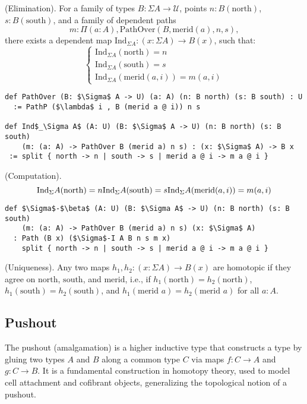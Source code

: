 \documentclass{article}
\begin{document}
\begin{theorem} (Elimination).
For a family of types \( B : \Sigma A \to \mathcal{U} \), points \( n : B(\text{north}) \), \( s : B(\text{south}) \), and a family
of dependent paths
\[
  m : \Pi (a : A), \text{PathOver}(B,\text{merid}(a),n,s),
\]
there exists a dependent map \( \text{Ind}_{\Sigma A} : (x : \Sigma A) \to B(x) \), such that:
\[
\begin{cases}
\text{Ind}_{\Sigma A}(\text{north}) = n \\
\text{Ind}_{\Sigma A}(\text{south}) = s \\
\text{Ind}_{\Sigma A}(\text{merid}(a,i)) = m(a,i)
\end{cases}
\]
\begin{lstlisting}[mathescape=true]
def PathOver (B: $\Sigma$ A -> U) (a: A) (n: B north) (s: B south) : U
  := PathP ($\lambda$ i , B (merid a @ i)) n s

def Ind$_\Sigma A$ (A: U) (B: $\Sigma$ A -> U) (n: B north) (s: B south)
    (m: (a: A) -> PathOver B (merid a) n s) : (x: $\Sigma$ A) -> B x
 := split { north -> n | south -> s | merid a @ i -> m a @ i }
\end{lstlisting}
\end{theorem}

\begin{theorem} (Computation).
\[
    \text{Ind}_\Sigma A(\text{north}) = n \\
    \text{Ind}_\Sigma A(\text{south}) = s \\
    \text{Ind}_\Sigma A(\text{merid}(a,i)) = m(a,i)
\]
\begin{lstlisting}[mathescape=true]
def $\Sigma$-$\beta$ (A: U) (B: $\Sigma A$ -> U) (n: B north) (s: B south)
    (m: (a: A) -> PathOver B (merid a) n s) (x: $\Sigma$ A)
  : Path (B x) ($\Sigma$-I A B n s m x)
    split { north -> n | south -> s | merid a @ i -> m a @ i }
\end{lstlisting}
\end{theorem}

\begin{theorem} (Uniqueness).
Any two maps \( h_1, h_2 : (x : \Sigma A) \to B(x) \) are homotopic if they agree
on \( \text{north} \), \( \text{south} \), and \( \text{merid} \), i.e.,
if \( h_1(\text{north}) = h_2(\text{north}) \), \( h_1(\text{south}) = h_2(\text{south}) \),
and \( h_1(\text{merid } a) = h_2(\text{merid } a) \) for all \( a : A \).
\end{theorem}

\subsection{Pushout}
The pushout (amalgamation) is a higher inductive type that constructs a type by
gluing two types \( A \) and \( B \) along a common type \( C \) via maps \( f : C \to A \)
and \( g : C \to B \). It is a fundamental construction in homotopy theory,
used to model cell attachment and cofibrant objects, generalizing
the topological notion of a pushout.
\end{document}
